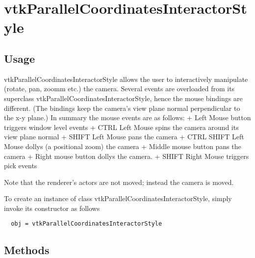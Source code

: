 \section{vtkParallelCoordinatesInteractorStyle}

\subsection{Usage}

 vtkParallelCoordinatesInteractorStyle allows the user to interactively manipulate
 (rotate, pan, zoomm etc.) the camera.
 Several events are overloaded from its superclass
 vtkParallelCoordinatesInteractorStyle, hence the mouse bindings are 
 different. (The bindings
 keep the camera's view plane normal perpendicular to the x-y plane.) In
 summary the mouse events are as follows:
 + Left Mouse button triggers window level events
 + CTRL Left Mouse spins the camera around its view plane normal
 + SHIFT Left Mouse pans the camera
 + CTRL SHIFT Left Mouse dollys (a positional zoom) the camera
 + Middle mouse button pans the camera
 + Right mouse button dollys the camera.
 + SHIFT Right Mouse triggers pick events

 Note that the renderer's actors are not moved; instead the camera is moved.

To create an instance of class vtkParallelCoordinatesInteractorStyle, simply
invoke its constructor as follows
\begin{verbatim}
  obj = vtkParallelCoordinatesInteractorStyle
\end{verbatim}
\subsection{Methods}

